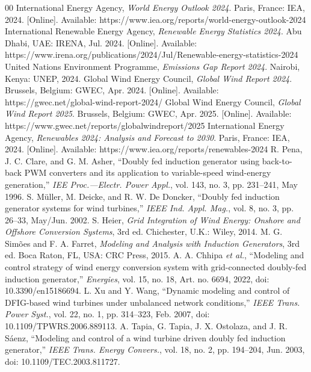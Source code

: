 \documentclass[conference]{IEEEtran}
\begin{document}
\balance
\begin{thebibliography}{00}
 International Energy Agency, \textit{World Energy Outlook 2024}. Paris, France: IEA, 2024. [Online]. Available: https://www.iea.org/reports/world-energy-outlook-2024
 International Renewable Energy Agency, \textit{Renewable Energy Statistics 2024}. Abu Dhabi, UAE: IRENA, Jul. 2024. [Online]. Available: https://www.irena.org/publications/2024/Jul/Renewable-energy-statistics-2024
 United Nations Environment Programme, \textit{Emissions Gap Report 2024}. Nairobi, Kenya: UNEP, 2024.
 Global Wind Energy Council, \textit{Global Wind Report 2024}. Brussels, Belgium: GWEC, Apr. 2024. [Online]. Available: https://gwec.net/global-wind-report-2024/
 Global Wind Energy Council, \textit{Global Wind Report 2025}. Brussels, Belgium: GWEC, Apr. 2025. [Online]. Available: https://www.gwec.net/reports/globalwindreport/2025
 International Energy Agency, \textit{Renewables 2024: Analysis and Forecast to 2030}. Paris, France: IEA, 2024. [Online]. Available: https://www.iea.org/reports/renewables-2024
 R. Pena, J. C. Clare, and G. M. Asher, ``Doubly fed induction generator using back-to-back PWM converters and its application to variable-speed wind-energy generation,'' \textit{IEE Proc.---Electr. Power Appl.}, vol. 143, no. 3, pp. 231--241, May 1996.
 S. M\"uller, M. Deicke, and R. W. De Doncker, ``Doubly fed induction generator systems for wind turbines,'' \textit{IEEE Ind. Appl. Mag.}, vol. 8, no. 3, pp. 26--33, May/Jun. 2002.
 S. Heier, \textit{Grid Integration of Wind Energy: Onshore and Offshore Conversion Systems}, 3rd ed. Chichester, U.K.: Wiley, 2014.
 M. G. Sim\~oes and F. A. Farret, \textit{Modeling and Analysis with Induction Generators}, 3rd ed. Boca Raton, FL, USA: CRC Press, 2015.
 A. A. Chhipa \textit{et al.}, ``Modeling and control strategy of wind energy conversion system with grid-connected doubly-fed induction generator,'' \textit{Energies}, vol. 15, no. 18, Art. no. 6694, 2022, doi: 10.3390/en15186694.
 L. Xu and Y. Wang, ``Dynamic modeling and control of DFIG-based wind turbines under unbalanced network conditions,'' \textit{IEEE Trans. Power Syst.}, vol. 22, no. 1, pp. 314--323, Feb. 2007, doi: 10.1109/TPWRS.2006.889113.
 A. Tapia, G. Tapia, J. X. Ostolaza, and J. R. S\'aenz, ``Modeling and control of a wind turbine driven doubly fed induction generator,'' \textit{IEEE Trans. Energy Convers.}, vol. 18, no. 2, pp. 194--204, Jun. 2003, doi: 10.1109/TEC.2003.811727.

\end{thebibliography}
\end{document}
